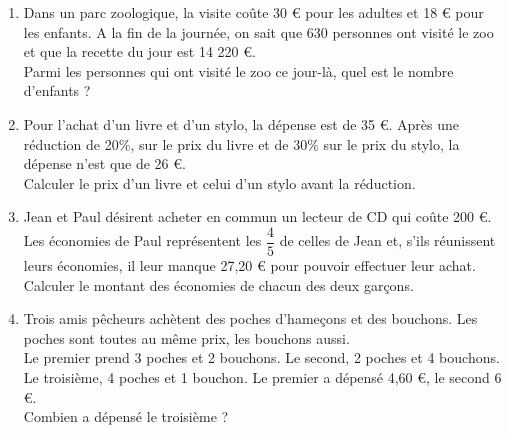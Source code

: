 \documentclass[a4paper,11pt,cours]{nsi}
\begin{document}
\begin{exercice}[]
	\begin{enumerate}
		\item 	Dans un parc zoologique, la visite coûte 30 € pour les adultes et 18 € pour les enfants. A la fin de la journée, on sait que 630 personnes ont visité le zoo et que la recette du jour est 14 220 €.\\
		Parmi les personnes qui ont visité le zoo ce jour-là, quel est le nombre d’enfants ?
		
		\item 	Pour l’achat d’un livre et d’un stylo, la dépense est de 35 €. Après une réduction de 20\%, sur le prix du livre et de 30\% sur le prix du stylo, la dépense n’est que de 26 €.\\
		Calculer le prix d’un livre et celui d’un stylo avant la réduction.
		
		\item	Jean et Paul désirent acheter en commun un lecteur de CD qui coûte 200 €.\\
		Les économies de Paul représentent les $\dfrac{4}{5}$ de celles de Jean et, s’ils réunissent leurs économies, il leur manque 27,20 € pour pouvoir effectuer leur achat.\\ 
		Calculer le montant des économies de chacun des deux garçons.
		
		\item	Trois amis pêcheurs achètent des poches d’hameçons et des bouchons. Les poches sont toutes au même prix, les bouchons aussi.\\
		Le premier prend 3 poches et 2 bouchons. Le second, 2 poches et 4 bouchons. Le troisième, 4 poches et 1 bouchon. Le premier a dépensé 4,60 €, le second 6 €.\\ Combien a dépensé le troisième ?
		
	\end{enumerate}
\end{exercice}
\end{document}
